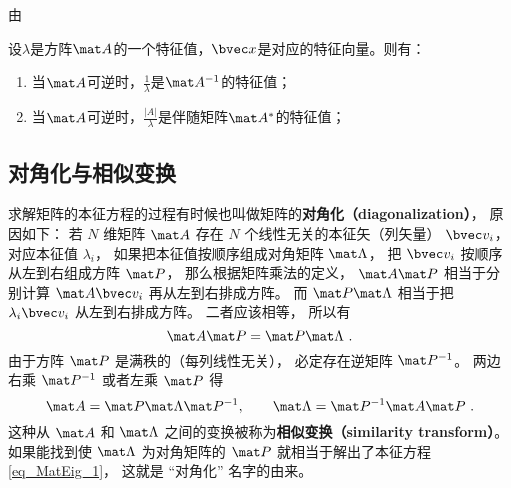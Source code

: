 由
\begin{theorem}{}
设$\lambda$是方阵$\mat A$的一个特征值，$\bvec x$是对应的特征向量。则有：
\begin{enumerate}
\item 当$\mat A$可逆时，$\frac{1}{\lambda }$是$\mat A^{-1}$的特征值；
\item 当$\mat A$可逆时，$\frac{|A|}{\lambda }$是伴随矩阵$\mat A^{*}$的特征值；

\end{enumerate}
\end{theorem}


\subsection{对角化与相似变换}
求解矩阵的本征方程的过程有时候也叫做矩阵的\textbf{对角化（diagonalization）}， 原因如下： 若 $N$ 维矩阵 $\mat A$ 存在 $N$ 个线性无关的本征矢（列矢量） $\bvec v_i$， 对应本征值 $\lambda_i$， 如果把本征值按顺序组成对角矩阵 $\mat \Lambda$， 把 $\bvec v_i$ 按顺序从左到右组成方阵 $\mat P$， 那么根据矩阵乘法的定义， $\mat A \mat P$ 相当于分别计算 $\mat A\bvec v_i$ 再从左到右排成方阵。 而 $\mat P\mat\Lambda$ 相当于把 $\lambda_i\bvec v_i$ 从左到右排成方阵。 二者应该相等， 所以有
\begin{equation}
\mat A \mat P = \mat P\mat\Lambda~.
\end{equation}
由于方阵 $\mat P$ 是满秩的（每列线性无关）， 必定存在逆矩阵%
$\mat P^{-1}$。 两边右乘 $\mat P^{-1}$ 或者左乘 $\mat P$ 得
\begin{equation}\label{eq_MatEig_3}
\mat A = \mat P\mat\Lambda\mat P^{-1}, \qquad
\mat \Lambda = \mat P^{-1}\mat A \mat P~.
\end{equation}
这种从 $\mat A$ 和 $\mat\Lambda$ 之间的变换被称为\textbf{相似变换（similarity transform）}。 如果能找到使 $\mat\Lambda$ 为对角矩阵的 $\mat P$ 就相当于解出了本征方程\autoref{eq_MatEig_1}， 这就是 “对角化” 名字的由来。
